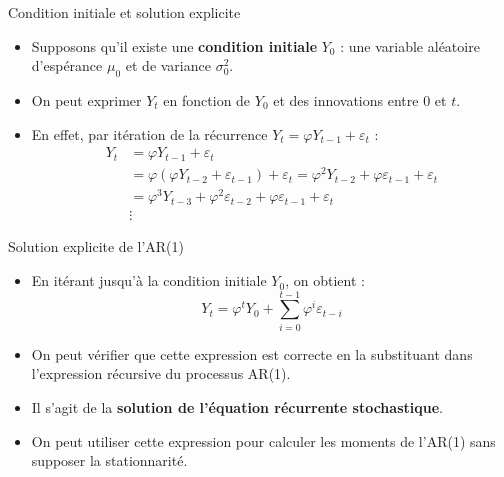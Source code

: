 \documentclass[11pt,aspectratio=169]{beamer}
\begin{document}
\begin{frame}{Condition initiale et solution explicite}

\begin{itemize}

\item Supposons qu'il existe une \textbf{condition initiale} $Y_0$ : une variable aléatoire d'espérance $\mu_0$ et de variance $\sigma_0^2$.\newline

\item On peut exprimer $Y_t$ en fonction de $Y_0$ et des innovations entre 0 et $t$.\newline

\item En effet, par itération de la récurrence $Y_t = \varphi Y_{t-1} + \varepsilon_t$ :
\begin{align*}
Y_t &= \varphi Y_{t-1} + \varepsilon_t \\
&= \varphi (\varphi Y_{t-2} + \varepsilon_{t-1}) + \varepsilon_t = \varphi^2 Y_{t-2} + \varphi \varepsilon_{t-1} + \varepsilon_t \\
&= \varphi^3 Y_{t-3} + \varphi^2 \varepsilon_{t-2} + \varphi \varepsilon_{t-1} + \varepsilon_t \\
&\vdots
\end{align*}

\end{itemize}
\end{frame}

\begin{frame}{Solution explicite de l'AR(1)}

\begin{itemize}

\item En itérant jusqu'à la condition initiale $Y_0$, on obtient :
\[
\boxed{Y_t = \varphi^t Y_0 + \sum_{i=0}^{t-1} \varphi^i \varepsilon_{t-i}}
\]

\item On peut vérifier que cette expression est correcte en la substituant dans l'expression récursive du processus AR(1).\newline

\item Il s'agit de la \textbf{solution de l'équation récurrente stochastique}.\newline

\item On peut utiliser cette expression pour calculer les moments de l'AR(1) sans supposer la stationnarité.

\end{itemize}
\end{frame}
\end{document}
